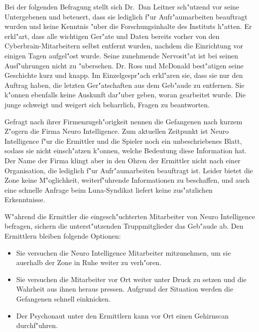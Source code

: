 Bei der folgenden Befragung stellt sich Dr.~Dan Leitner sch"utzend vor seine Untergebenen und beteuert, dass sie lediglich f"ur Aufr"aumarbeiten beauftragt wurden und keine Kenntnis "uber die Forschungsinhalte des Instituts h"atten. Er erkl"art, dass alle wichtigen Ger"ate und Daten bereits vorher von den Cyberbrain-Mitarbeitern selbst entfernt wurden, nachdem die Einrichtung vor einigen Tagen aufgel"ost wurde. Seine zunehmende Nervosit"at ist bei seinen Ausf"uhrungen nicht zu "ubersehen. Dr. Ross und McDonald best"atigen seine Geschichte kurz und knapp. Im Einzelgespr"ach erkl"aren sie, dass sie nur den Auftrag haben, die letzten Ger"atschaften aus dem Geb"aude zu entfernen. Sie k"onnen ebenfalls keine Auskunft dar"uber geben, woran gearbeitet wurde. Die junge \ml{} schweigt und weigert sich beharrlich, Fragen zu beantworten.

Gefragt nach ihrer Firmenzugeh"origkeit nennen die Gefangenen nach kurzem Z"ogern die Firma Neuro Intelligence. Zum aktuellen Zeitpunkt ist Neuro Intelligence f"ur die Ermittler und die Spieler noch ein unbeschriebenes Blatt, sodass sie nicht einsch"atzen k"onnen, welche Bedeutung diese Information hat. Der Name der Firma klingt aber in den Ohren der Ermittler nicht nach einer Organisation, die lediglich f"ur Aufr"aumarbeiten beauftragt ist. Leider bietet die Zone keine M"oglichkeit, weiterf"uhrende Informationen zu beschaffen, und auch eine schnelle Anfrage beim Luna-Syndikat liefert keine zus"atzlichen Erkenntnisse.

W"ahrend die Ermittler die eingesch"uchterten Mitarbeiter von Neuro Intelligence befragen, sichern die unterst"utzenden Truppmitglieder das Geb"aude ab. Den Ermittlern bleiben folgende Optionen:

\begin{itemize}
	\item Sie versuchen die Neuro Intelligence Mitarbeiter mitzunehmen, um sie au\3erhalb der Zone in Ruhe weiter zu verh"oren.
	\item Sie versuchen die Mitarbeiter vor Ort weiter unter Druck zu setzen und die Wahrheit aus ihnen heraus pressen. Aufgrund 
		der Situation werden die Gefangenen schnell einknicken.
	\item Der Psychonaut unter den Ermittlern kann vor Ort einen Gehirnscan durchf"uhren.
\end{itemize}

